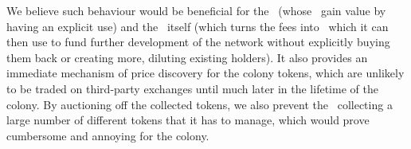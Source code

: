 We believe such behaviour would be beneficial for the \rcths\ (whose \rcts\ gain value by having an explicit use) and the \rc\ itself (which turns the fees into \rcts\ which it can then use to fund further development of the network without explicitly buying them back or creating more, diluting existing holders). It also provides an immediate mechanism of price discovery for the colony tokens, which are unlikely to be traded on third-party exchanges until much later in the lifetime of the colony. By auctioning off the collected tokens, we also prevent the \rc\ collecting a large number of different tokens that it has to manage, which would prove cumbersome and annoying for the colony.




